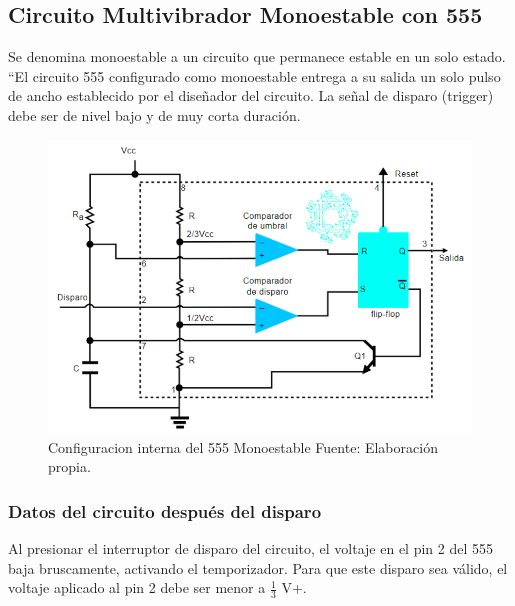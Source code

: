 \documentclass[osajnl,twocolumn,showpacs,superscriptaddress,10pt]{revtex4-1}
\begin{document}
\subsection{Circuito Multivibrador Monoestable con 555}

Se denomina monoestable a un circuito que permanece estable en un solo estado. “El circuito 555 configurado como monoestable entrega a su salida un solo pulso de ancho establecido por el diseñador del circuito. La señal de disparo (trigger) debe ser de nivel bajo y de muy corta duración.

\begin{figure}[H]
\centering
\includegraphics[width = \columnwidth]{Fig_1.png}
\caption{Configuracion interna del 555 Monoestable
Fuente: Elaboración propia.}
\end{figure}

\subsubsection{Datos del circuito después del disparo}

Al presionar el interruptor de disparo del circuito, el voltaje en el pin 2 del 555 baja bruscamente, activando el temporizador. Para que este disparo sea válido, el voltaje aplicado al pin 2 debe ser menor a $\frac{1}{3}$ V+.
\end{document}
